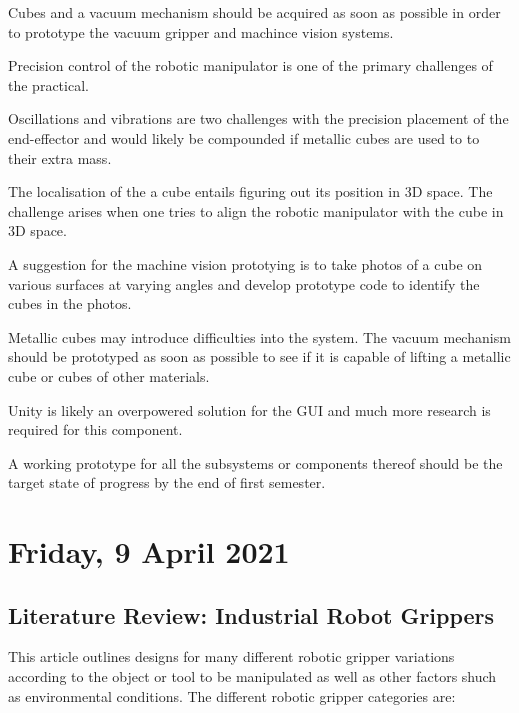 \begin{compactitem}
    \item Cubes and a vacuum mechanism should be acquired as soon as possible in order to prototype the vacuum gripper and machince vision systems.
    \item Precision control of the robotic manipulator is one of the primary challenges of the practical.
    \item Oscillations and vibrations are two challenges with the precision placement of the end-effector and would likely be compounded if metallic cubes are used to to their extra mass.
    \item The localisation of the a cube entails figuring out its position in 3D space. The challenge arises when one tries to align the robotic manipulator with the cube in 3D space.
    \item A suggestion for the machine vision prototying is to take photos of a cube on various surfaces at varying angles and develop prototype code to identify the cubes in the photos.
    \item Metallic cubes may introduce difficulties into the system. The vacuum mechanism should be prototyped as soon as possible to see if it is capable of lifting a metallic cube or cubes of other materials.
    \item Unity is likely an overpowered solution for the \ac{GUI} and much more research is required for this component.
    \item A working prototype for all the subsystems or components thereof should be the target state of progress by the end of first semester.
\end{compactitem}

\pendsign

\section[2021/04/09]{Friday, 9 April 2021}

\subsection{Literature Review: Industrial Robot Grippers \cite{lundstrom_1974}}

This article outlines designs for many different robotic gripper variations according to the object or tool to be manipulated as well as other factors shuch as environmental conditions. The different robotic gripper categories are:

